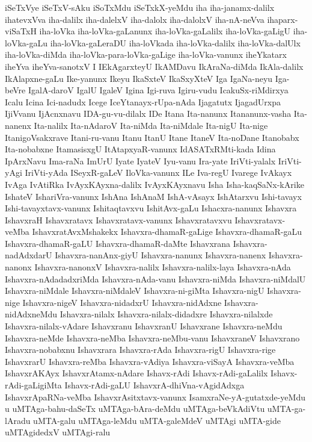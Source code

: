 {iSeTxVye
iSeTxV-sAku
iSoTxMdu
iSeTxkX-yeMdu
iha
iha-janamx-dalilx
ihatevxVva
iha-dalilx
iha-dalelxV
iha-dalolx
iha-dalolxV
iha-nA-neVva
ihaparx-viSaTxH
iha-loVka
iha-loVka-gaLanunx
iha-loVka-gaLalilx
iha-loVka-gaLigU
iha-loVka-gaLu
iha-loVka-gaLeraDU
iha-loVkada
iha-loVka-dalilx
iha-loVka-dalUlx
iha-loVka-diMda
iha-loVka-para-loVka-gaLige
iha-loVka-vanunx
iheYkatarx
iheYva
iheYva-sanotxV
I
IEkAgarxteyU
IkAMDavu
IkAraNa-diMda
IkAla-dalilx
IkAlapxne-gaLu
Ike-yanunx
Ikeyu
IkaSxteV
IkaSxyXteV
Iga
IgaNa-neyu
Iga-beVre
IgalA-daroV
IgalU
IgaleV
Igina
Igi-ruva
Igiru-vudu
IcakuSx-riMdirxya
Icalu
Icina
Ici-nadudx
Icege
IceYtanayx-rUpa-nAda
Ijagatutx
IjagadUrxpa
IjiVvanu
IjAcnxnavu
IDA-gu-vu-dilalx
IDe
Itana
Ita-nanunx
Itananunx-vasha
Ita-nanenx
Ita-nalilx
Ita-nAdaroV
Ita-niMda
Ita-niMdale
Ita-nigU
Ita-nige
ItanigoVsakxrave
Itani-ru-vanu
Itanu
ItanU
Itane
ItaneV
Ita-noDane
Itanobabx
Ita-nobabxne
ItamasisxgU
ItAtapxyaR-vanunx
IdASATxRMti-kada
Idina
IpArxNavu
Ima-raNa
ImUrU
Iyate
IyateV
Iyu-vanu
Ira-yate
IriVti-yalalx
IriVti-yAgi
IriVti-yAda
ISeyxR-gaLeV
IloVka-vanunx
ILe
Iva-regU
Ivarege
IvAkayx
IvAga
IvAtiRka
IvAyxKAyxna-dalilx
IvAyxKAyxnavu
Isha
Isha-kaqSaNx-kArike
IshateV
IshariVra-vanunx
IshAna
IshAnaM
IshA-vAsayx
IshAtarxvu
Ishi-tavayx
Ishi-tavayxtavx-vanunx
Ishitaqtavxvu
IshitAvx-gaLu
Ishacxra-nanunx
Ishavxra
IshavxraH
Ishavxratavx
Ishavxratavx-vanunx
Ishavxratavxvu
Ishavxratavx-veMba
IshavxratAvxMshakekx
Ishavxra-dhamaR-gaLige
Ishavxra-dhamaR-gaLu
Ishavxra-dhamaR-gaLU
Ishavxra-dhamaR-daMte
Ishavxrana
Ishavxra-nadAdxdarU
Ishavxra-nanAnx-giyU
Ishavxra-nanunx
Ishavxra-nanenx
Ishavxra-nanonx
Ishavxra-nanonxV
Ishavxra-nalilx
Ishavxra-nalilx-laya
Ishavxra-nAda
Ishavxra-nAdadadxriMda
Ishavxra-nAda-vanu
Ishavxra-niMda
Ishavxra-niMdalU
Ishavxra-niMdale
Ishavxra-niMdaleV
Ishavxra-ni-giMta
Ishavxra-nigU
Ishavxra-nige
Ishavxra-nigeV
Ishavxra-nidadxrU
Ishavxra-nidAdxne
Ishavxra-nidAdxneMdu
Ishavxra-nilalx
Ishavxra-nilalx-didadxre
Ishavxra-nilalxde
Ishavxra-nilalx-vAdare
Ishavxranu
IshavxranU
Ishavxrane
Ishavxra-neMdu
Ishavxra-neMde
Ishavxra-neMba
Ishavxra-neMbu-vanu
IshavxraneV
Ishavxrano
Ishavxra-nobabxnu
Ishavxrara
Ishavxra-rAda
Ishavxra-rigU
Ishavxra-rige
IshavxrarU
Ishavxra-reMba
Ishavxra-vAdiya
Ishavxra-viSayA
Ishavxra-veMba
IshavxrAKAyx
IshavxrAtamx-nAdare
Ishavx-rAdi
Ishavx-rAdi-gaLalilx
Ishavx-rAdi-gaLigiMta
Ishavx-rAdi-gaLU
IshavxrA-dhiVna-vAgidAdxga
IshavxrApaRNa-veMba
IshavxrAsitxtavx-vanunx
IsamxraNe-yA-gutatxde-yeMdu
u
uMTAga-bahu-daSeTx
uMTAga-bAra-deMdu
uMTAga-beVkAdiVtu
uMTA-ga-lAradu
uMTA-galu
uMTAga-leMdu
uMTA-galeMdeV
uMTAgi
uMTA-gide
uMTAgidedxV
uMTAgi-ralu
}
